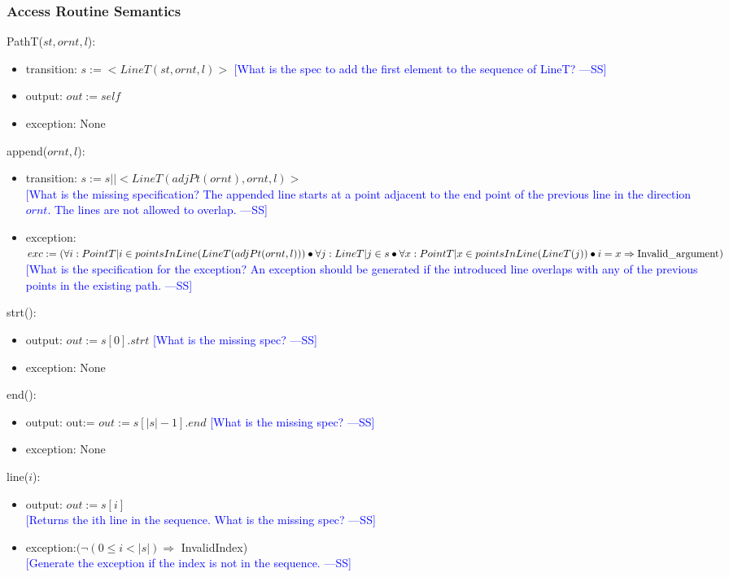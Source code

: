 \documentclass[12pt]{article}
\newcommand{\authornote}[3]{\textcolor{#1}{[#3 ---#2]}}
\newcommand{\authornote}[3]{}
\newcommand{\wss}[1]{\authornote{blue}{SS}{#1}}
\begin{document}
\subsubsection* {Access Routine Semantics}

PathT($st, ornt, l$):
\begin{itemize}
\item transition: $s:=<LineT(st, ornt, l)>$ \wss{What is the spec to add the first element to the sequence
  of LineT?}
\item output: $out := \mathit{self}$
\item exception: None
\end{itemize}

\noindent append($ornt, l$):
\begin{itemize}
\item transition: $s:= s ||<LineT(adjPt(ornt), ornt, l)>$\\ \wss{What is the missing specification?  The appended line
    starts at a point adjacent to the end point of the previous line in the
    direction $ornt$.  The lines are not allowed to
    overlap.}
\item exception: $exc:= (\forall i : PointT|i \in pointsInLine(LineT(adjPt(ornt, l))) \bullet \forall j: LineT| j \in s \bullet \forall x : PointT | x \in pointsInLine(LineT(j)) \bullet i = x \Rightarrow \mbox{Invalid\textunderscore argument})$\\ \wss{What is the specification for the exception?  An exception
    should be generated if the introduced line overlaps with any of the previous
    points in the existing path.}
\end{itemize}

\noindent strt():
\begin{itemize}
\item output: $out := s[0].strt$ \wss{What is the missing spec?}
\item exception: None
\end{itemize}

\noindent end():
\begin{itemize}
\item output: out:=  $out := s[|s|-1].end$ \wss{What is the missing spec?}
\item exception: None
\end{itemize}

\noindent line($i$):
\begin{itemize}
\item output: $out:=s[i] $\\ \wss{Returns the ith line in the sequence.  What is the missing spec?}
\item exception:$(\neg(0 \leq i < |s|) \Rightarrow$ InvalidIndex) \\ \wss{Generate the exception if the index is not in the sequence.}
\end{itemize}
\end{document}
